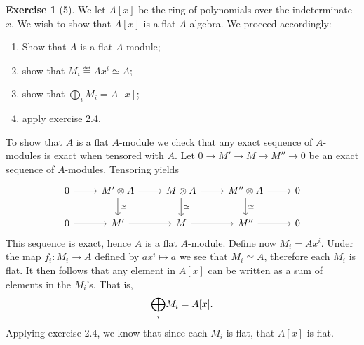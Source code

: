 \documentclass{article}
\theoremstyle{definition}
\newtheorem*{exercise}{Exercise}
\begin{document}
\begin{exercise}[5]
    We let $A[x]$ be the ring of polynomials over the indeterminate $x$. We
    wish to show that $A[x]$ is a flat $A$-algebra. We proceed accordingly:
    \begin{enumerate}
        \item Show that $A$ is a flat $A$-module;
        \item show that $M_i \eqdef Ax^i \simeq A$;
        \item show that $\bigoplus_i M_i = A[x]$;
        \item apply exercise 2.4.
    \end{enumerate}
    
    To show that $A$ is a flat $A$-module we check that any exact sequence of
    $A$-modules is exact when tensored with $A$. Let $0 \to M' \to M \to M''
    \to 0$ be an exact sequence of $A$-modules. Tensoring yields
    \[
    \begin{tikzcd}
        0 \arrow[r] & M'\otimes A \arrow[r]\arrow[d, "\simeq"] & M\otimes A \arrow[r]\arrow[d, "\simeq"] & M''\otimes A \arrow[r] \arrow[d, "\simeq"] & 0 \\
        0 \arrow[r] & M' \arrow[r] & M \arrow[r] & M'' \arrow[r] & 0
    \end{tikzcd}
    \]
    This sequence is exact, hence $A$ is a flat $A$-module.  Define now $M_i =
    Ax^i$. Under the map $f_i : M_i \to A$ defined by $ax^i \mapsto a$ we see
    that $M_i \simeq A$, therefore each $M_i$ is flat. It then follows that any
    element in $A[x]$ can be written as a sum of elements in the $M_i$'s. That
    is,
    \begin{equation}
        \notag
        \underset{i}{\bigoplus}M_i = A[x].
    \end{equation}
    Applying exercise 2.4, we know that since each $M_i$ is flat, that $A[x]$
    is flat. 
\end{exercise}
\end{document}
